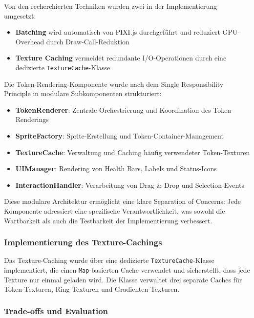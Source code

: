 Von den recherchierten Techniken wurden zwei in der Implementierung umgesetzt:

\begin{itemize}
	\item \textbf{Batching} wird automatisch von PIXI.js durchgeführt und reduziert \ac{GPU}-Overhead durch Draw-Call-Reduktion
	\item \textbf{Texture Caching} vermeidet redundante \ac{I/O}-Operationen durch eine dedizierte \texttt{TextureCache}-Klasse
\end{itemize}

Die Token-Rendering-Komponente wurde nach dem Single Responsibility Principle \autocite[S. 49-50]{ShvetsDesignPatterns} in modulare Subkomponenten strukturiert:

\begin{itemize}
	\item \textbf{TokenRenderer}: Zentrale Orchestrierung und Koordination des Token-Renderings
	\item \textbf{SpriteFactory}: Sprite-Erstellung und Token-Container-Management
	\item \textbf{TextureCache}: Verwaltung und Caching häufig verwendeter Token-Texturen
	\item \textbf{UIManager}: Rendering von Health Bars, Labels und Status-Icons
	\item \textbf{InteractionHandler}: Verarbeitung von Drag \& Drop und Selection-Events
\end{itemize}

Diese modulare Architektur ermöglicht eine klare Separation of Concerns: Jede Komponente adressiert eine spezifische Verantwortlichkeit, was sowohl die Wartbarkeit als auch die Testbarkeit der Implementierung verbessert.

\subsubsection{Implementierung des Texture-Cachings}

Das Texture-Caching wurde über eine dedizierte \texttt{TextureCache}-Klasse implementiert, die einen \texttt{Map}-basierten Cache verwendet und sicherstellt, dass jede Texture nur einmal geladen wird. Die Klasse verwaltet drei separate Caches für Token-Texturen, Ring-Texturen und Gradienten-Texturen.

\subsubsection{Trade-offs und Evaluation}

